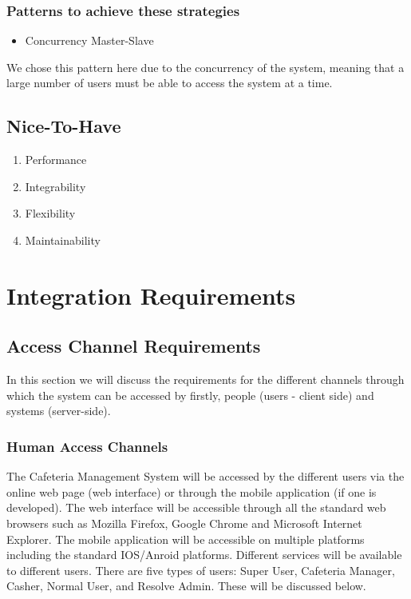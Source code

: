 \documentclass[a4paper,12pt]{article}
\begin{document}
	\subsubsection{Patterns to achieve these strategies}
	 \begin{itemize}
		\item Concurrency Master-Slave 
	\end{itemize}
We chose this pattern here due to the concurrency of the system, meaning that a large number of users must be able to access the system at a time.
\subsection{Nice-To-Have}
	\begin{enumerate}
		\item Performance
		\item Integrability
		\item Flexibility
		\item Maintainability
\end{enumerate}

\section{Integration Requirements}
\subsection{Access Channel Requirements}
In this section we will discuss the requirements for the different channels through which the system can be accessed by firstly, people (users - client side) and systems (server-side).


\subsubsection{Human Access Channels}
The Cafeteria Management System will be accessed by the different users via the online web page (web interface) or through the mobile application (if one is developed). The web interface will be accessible through all the standard web browsers such as Mozilla Firefox, Google Chrome and Microsoft Internet Explorer. The mobile application will be accessible on multiple platforms including the standard IOS/Anroid platforms. Different services will be available to different users. There are five types of users: Super User, Cafeteria Manager, Casher, Normal User, and Resolve Admin. These will be discussed below. \\
\end{document}
